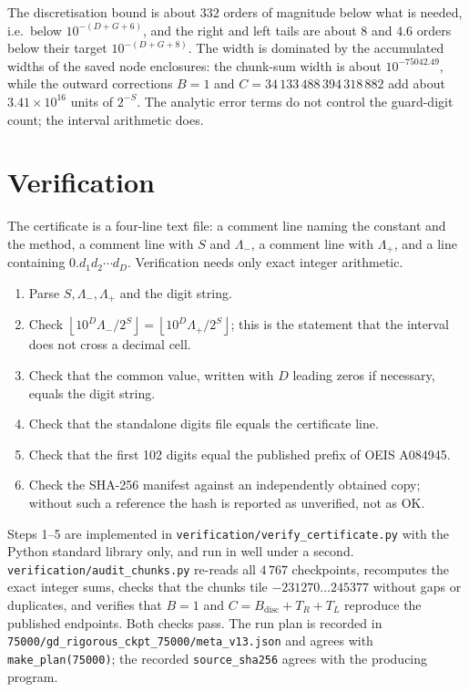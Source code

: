 \documentclass[11pt,a4paper]{article}
\theoremstyle{remark}
\newcommand{\floor}[1]{\left\lfloor #1 \right\rfloor}
\begin{document}
The discretisation bound is about $332$ orders of magnitude below
what is needed, i.e.\ below $10^{-(D+G+6)}$, and the right and left tails
are about $8$ and $4.6$ orders below their target $10^{-(D+G+8)}$.
The width is dominated by the accumulated widths of the saved node
enclosures: the chunk-sum width is about $10^{-75042.49}$, while the
outward corrections $B=1$ and $C=34\,133\,488\,394\,318\,882$ add about
$3.41\times10^{16}$ units of $2^{-S}$. The analytic error terms do not
control the guard-digit count; the interval arithmetic does.

\section{Verification}

The certificate is a four-line text file: a comment line naming the
constant and the method, a comment line with $S$ and $\Lambda_-$, a
comment line with $\Lambda_+$, and a line containing
$0.d_1d_2\cdots d_D$. Verification needs only exact integer arithmetic.

\begin{enumerate}[leftmargin=1.6em]
\item Parse $S,\Lambda_-,\Lambda_+$ and the digit string.
\item Check $\floor{10^D\Lambda_-/2^S}=\floor{10^D\Lambda_+/2^S}$;
  this is the statement that the interval does not cross a decimal cell.
\item Check that the common value, written with $D$ leading zeros if
  necessary, equals the digit string.
\item Check that the standalone digits file equals the certificate line.
\item Check that the first 102 digits equal the published prefix of OEIS
  A084945.
\item Check the SHA-256 manifest against an independently obtained copy;
  without such a reference the hash is reported as unverified, not as OK.
\end{enumerate}

Steps 1--5 are implemented in \texttt{verification/verify\_certificate.py}
with the Python standard library only, and run in well under a second.
\texttt{verification/audit\_chunks.py} re-reads all $4\,767$ checkpoints,
recomputes the exact integer sums, checks that the chunks tile
$-231270\ldots245377$ without gaps or duplicates, and verifies that
$B=1$ and $C=B_{\mathrm{disc}}+T_R+T_L$ reproduce the published endpoints.
Both checks pass. The run plan is recorded in
\texttt{75000/gd\_rigorous\_ckpt\_75000/meta\_v13.json} and agrees with
\texttt{make\_plan(75000)}; the recorded \texttt{source\_sha256} agrees
with the producing program.
\end{document}
